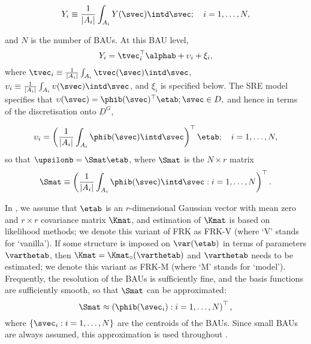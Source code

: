 \begin{equation}\label{eq:Yi0}
Y_i \equiv \frac{1}{|A_i|}\int_{A_i} Y(\svec) \intd \svec; \quad i = 1,\dots,N,
\end{equation}

\noindent and $N$ is the number of BAUs. At this BAU level,
\begin{equation} \label{eq:Yi1}
Y_i = \tvec_i^\top\alphab + \upsilon_i + \xi_i,
\end{equation}
\noindent where $\tvec_i \equiv \frac{1}{|A_i|}\int_{A_i} \tvec(\svec) \intd \svec$, $\upsilon_i\equiv \frac{1}{|A_i|}\int_{A_i} \upsilon(\svec) \intd \svec$, and $\xi_i$ is specified below. The SRE model specifies that $\upsilon(\svec) = \phib(\svec)^\top\etab; \svec \in D,$ and hence in terms of the discretisation onto $D^G$,


$$
\upsilon_i = \left(\frac{1}{|A_i|}\int_{A_i}\phib(\svec)\intd \svec\right)^\top \etab; \quad i = 1,\dots,N,
$$
\noindent so that $\upsilonb = \Smat\etab$, where $\Smat$ is the $N \times r$ matrix
\begin{equation}\label{eq:S_integral}
\Smat \equiv \left(\frac{1}{|A_i|}\int_{A_i}\phib(\svec)\intd\svec : i = 1,\dots,N\right)^\top.
\end{equation}

In , we assume that $\etab$ is an $r$-dimensional Gaussian vector with mean zero and $r \times r$ covariance matrix $\Kmat$, and estimation of $\Kmat$ is based on likelihood methods; we denote this variant of FRK as FRK-V (where `V' stands for `vanilla'). If some structure is imposed on $\var(\etab)$ in terms of parameters $\varthetab$, then $\Kmat = \Kmat_\circ(\varthetab)$ and $\varthetab$ needs to be estimated; we denote this variant as FRK-M (where `M' stands for `model'). Frequently, the resolution of the BAUs is sufficiently fine, and the basis functions are sufficiently smooth, so that $\Smat$ can be approximated:
\begin{equation}\label{eq:Sapprox}
\Smat \approx \left(\phib(\svec_i) : i = 1,\dots,N\right)^\top,
\end{equation}
where $\{\svec_i: i = 1,\dots,N\}$ are the centroids of the BAUs. Since small BAUs are always assumed, this approximation is used throughout .

